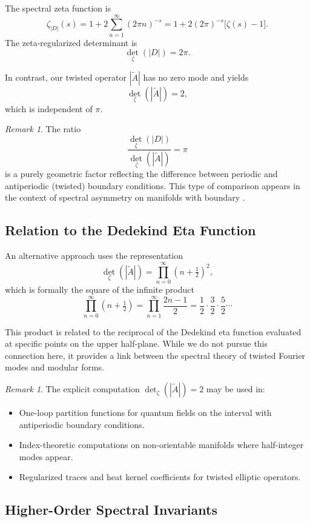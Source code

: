 \documentclass[11pt]{amsart}
\theoremstyle{definition}
\theoremstyle{remark}
\newtheorem{remark}[theorem]{Remark}
\begin{document}
The spectral zeta function is
\[
\zeta_{|D|}(s) = 1 + 2\sum_{n=1}^{\infty} (2\pi n)^{-s} = 1 + 2(2\pi)^{-s}\bigl[\zeta(s) - 1\bigr].
\]
The zeta-regularized determinant is \cite{elizalde}
\[
\det_\zeta(|D|) = 2\pi.
\]

In contrast, our twisted operator $|\widetilde{A}|$ has no zero mode and yields
\[
\det_\zeta(|\widetilde{A}|) = 2,
\]
which is independent of $\pi$.

\begin{remark}
The ratio
\[
\frac{\det_\zeta(|D|)}{\det_\zeta(|\widetilde{A}|)} = \pi
\]
is a purely geometric factor reflecting the difference between periodic and antiperiodic (twisted) boundary conditions. This type of comparison appears in the context of spectral asymmetry on manifolds with boundary \cite{atiyah-patodi-singer}.
\end{remark}

\subsection{Relation to the Dedekind Eta Function}

An alternative approach uses the representation
\[
\det_\zeta(|\widetilde{A}|) = \prod_{n=0}^{\infty} (n + \tfrac{1}{2})^2,
\]
which is formally the square of the infinite product
\[
\prod_{n=0}^{\infty} (n + \tfrac{1}{2}) = \prod_{n=1}^{\infty} \frac{2n-1}{2} = \frac{1}{2} \cdot \frac{3}{2} \cdot \frac{5}{2} \cdots
\]

This product is related to the reciprocal of the Dedekind eta function evaluated at specific points on the upper half-plane. While we do not pursue this connection here, it provides a link between the spectral theory of twisted Fourier modes and modular forms.

\begin{remark}
The explicit computation $\det_\zeta(|\widetilde{A}|) = 2$ may be used in:
\begin{itemize}
\item One-loop partition functions for quantum fields on the interval with antiperiodic boundary conditions.
\item Index-theoretic computations on non-orientable manifolds where half-integer modes appear.
\item Regularized traces and heat kernel coefficients for twisted elliptic operators.
\end{itemize}
\end{remark}

\subsection{Higher-Order Spectral Invariants}
\end{document}
